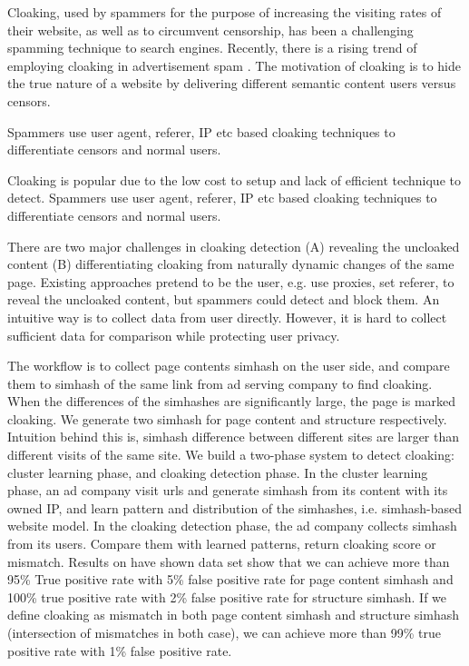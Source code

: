 \documentclass[letterpaper,twocolumn,10pt]{article}
\begin{document}
Cloaking, used by spammers for the purpose of increasing the visiting rates of
their website, as well as to circumvent censorship, has been a challenging
spamming technique to search engines. Recently, there is a rising trend of employing cloaking in advertisement spam \cite{li2012knowing}.  The motivation of cloaking is to hide the true nature of a website by delivering different semantic content users versus censors.

Spammers use user agent, referer, IP etc based cloaking techniques to differentiate censors and normal users.

Cloaking is popular due to the low cost to setup and lack of efficient technique to detect. Spammers use user agent, referer, IP etc based cloaking techniques to differentiate censors and normal users.

There are two major challenges in cloaking detection (A) revealing the uncloaked content (B) differentiating cloaking from naturally dynamic changes of the same page. Existing approaches pretend to be the user, e.g. use proxies, set referer, to reveal the uncloaked content, but spammers could detect and block them. An intuitive way is to collect data from user directly. However, it is hard to collect sufficient data for comparison while protecting user privacy.


The workflow is to collect page contents simhash on the user side, and compare them to simhash of the same link from ad serving company to find cloaking. When the differences of the simhashes are significantly large, the page is marked cloaking. We generate two simhash for page content and structure respectively. Intuition behind this is, simhash difference between different sites are larger than different visits of the same site. We build a two-phase system to detect cloaking: cluster learning phase, and cloaking detection phase. In the cluster learning phase, an ad company visit urls and generate simhash from its content with its owned IP, and learn pattern and distribution of the simhashes, i.e. simhash-based website model. In the cloaking detection phase, the ad company collects simhash from its users. Compare them with learned patterns, return cloaking score or mismatch. Results on have shown data set show that we can achieve more than 95\% True positive rate with 5\% false positive rate for page content simhash and 100\% true positive rate with 2\% false positive rate for structure simhash. If we define cloaking as mismatch in both page content simhash and structure simhash (intersection of mismatches in both case), we can achieve more than 99\% true positive rate with 1\% false positive rate.
\end{document}
